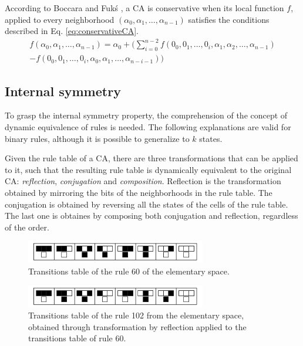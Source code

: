 \documentclass{llncs}
\begin{document}
According to Boccara and Fukś \cite{boccara2002}, a CA is conservative when its local function $f$, applied to every neighborhood $(\alpha_0,\alpha_1, \dots, \alpha_{n-1})$ satisfies the conditions described in Eq. \ref{eq:conservativeCA}.
\begin{equation}
\begin{split}
f(\alpha_0,\alpha_1, \dots,\alpha_{n-1}) = \alpha_0 + (\sum_{i=0}^{n-2}f(0_0,0_1, \dots,0_i,\alpha_1,\alpha_2, \dots,\alpha_{n-1}) \\- f(0_0,0_1, \dots,0_i,\alpha_0,\alpha_1, \dots,\alpha_{n-i-1}))
\label{eq:conservativeCA}
\end{split}
\end{equation}

\subsection{Internal symmetry}
To grasp the internal symmetry property, the comprehension of the concept of dynamic equivalence of rules is needed. The following explanations are valid for binary rules, although it is possible to generalize to $k$ states.

Given the rule table of a CA, there are three transformations that can be applied to it, such that the resulting rule table is  dynamically equivalent to the original CA: \textit{reflection}, \textit{conjugation} and \textit{composition}. Reflection is the transformation obtained by mirroring the bits of the neighborhoods in the rule table. The conjugation is obtained by reversing all the states of the cells of the rule table. The last one is obtaines by composing both conjugation and reflection, regardless of the order.

  \begin{figure}[!ht]
    \centering
    \includegraphics[width=0.7\textwidth]{fig_ruleIcon60.png}
    \caption{Transitions table of the rule 60 of the elementary space.}
    \label{fig:table60}
  \end{figure}
  \begin{figure}[!ht]
    \centering
    \includegraphics[width=0.7\textwidth]{fig_ruleIcon102.png}
    \caption{Transitions table of the rule 102 from the elementary space, obtained through transformation by reflection applied to the transitions table of rule 60.}
    \label{fig:table102}
  \end{figure}
\end{document}
